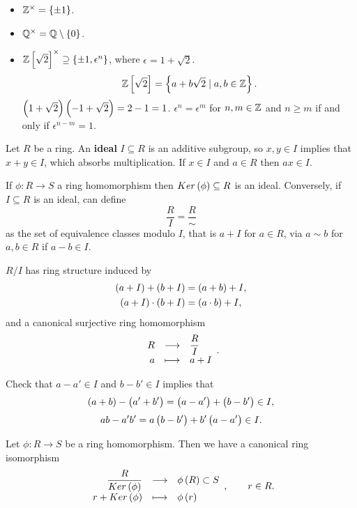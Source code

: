 \begin{example*}
\hfill
\begin{itemize}
\item $ \Z^\times = \cbr{\pm 1} $.
\item $ \Q^\times = \Q \setminus \cbr{0} $.
\item $ \Z\sbr{\sqrt{2}}^\times \supseteq \cbr{\pm 1, \epsilon^n} $, where $ \epsilon = 1 + \sqrt{2} $.
$$ \Z\sbr{\sqrt{2}} = \cbr{a + b\sqrt{2} \mid a, b \in \Z}. $$
$ \br{1 + \sqrt{2}}\br{-1 + \sqrt{2}} = 2 - 1 = 1 $. $ \epsilon^n = \epsilon^m $ for $ n, m \in \mathbb{Z} $ and $ n \ge m $ if and only if $ \epsilon^{n - m} = 1 $.
\end{itemize}
\end{example*}

\begin{definition}
Let $ R $ be a ring. An \textbf{ideal} $ I \subseteq R $ is an additive subgroup, so $ x, y \in I $ implies that $ x + y \in I $, which absorbs multiplication. If $ x \in I $ and $ a \in R $ then $ ax \in I $.
\end{definition}

\begin{fact*}
If $ \phi : R \to S $ a ring homomorphism then $ Ker\br{\phi} \subseteq R $ is an ideal. Conversely, if $ I \subseteq R $ is an ideal, can define
$$ \dfrac{R}{I} = \dfrac{R}{\sim} $$
as the set of equivalence classes modulo $ I $, that is $ a + I $ for $ a \in R $, via $ a \sim b $ for $ a, b \in R $ if $ a - b \in I $.
\end{fact*}

\begin{proposition}
$ R / I $ has ring structure induced by
\begin{align*}
\br{a + I} + \br{b + I} & = \br{a + b} + I, \\
\br{a + I} \cdot \br{b + I} & = \br{a \cdot b} + I,
\end{align*}
and a canonical surjective ring homomorphism
$$ \function{R}{\dfrac{R}{I}}{a}{a + I}. $$
\end{proposition}

Check that $ a - a' \in I $ and $ b - b' \in I $ implies that
$$ \br{a + b} - \br{a' + b'} = \br{a - a'} + \br{b - b'} \in I, $$
$$ ab - a'b' = a\br{b - b'} + b'\br{a - a'} \in I. $$

\begin{theorem}
\label{thm:firstisomorphism}
Let $ \phi : R \to S $ be a ring homomorphism. Then we have a canonical ring isomorphism
$$ \function{\dfrac{R}{Ker\br{\phi}}}{\phi\br{R} \subset S}{r + Ker\br{\phi}}{\phi\br{r}}, \qquad r \in R. $$
\end{theorem}

